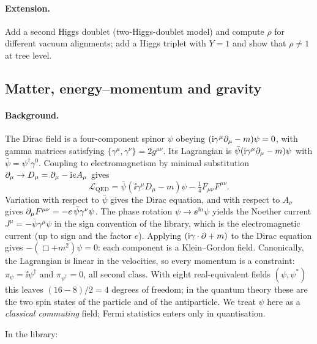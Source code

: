 \paragraph{Extension.} Add a second Higgs doublet (two-Higgs-doublet model) and compute $\rho$ for different vacuum alignments; add a Higgs triplet with $Y=1$ and show that $\rho\ne1$ at tree level.

\subsection{Matter, energy--momentum and gravity}


\paragraph{Background.} The Dirac field is a four-component spinor $\psi$ obeying $(\mathrm{i}\gamma^\mu\partial_\mu-m)\psi=0$, with gamma matrices satisfying $\{\gamma^\mu,\gamma^\nu\}=2g^{\mu\nu}$. Its Lagrangian is $\bar\psi(\mathrm{i}\gamma^\mu\partial_\mu-m)\psi$ with $\bar\psi=\psi^\dagger\gamma^0$. Coupling to electromagnetism by minimal substitution $\partial_\mu\to D_\mu=\partial_\mu-\mathrm{i} eA_\mu$ gives
\begin{equation}
\mathcal L_{\mathrm{QED}}=\bar\psi(\ii\gamma^\mu D_\mu-m)\psi-\tfrac14F_{\mu\nu}F^{\mu\nu}.
\end{equation}
Variation with respect to $\bar\psi$ gives the Dirac equation, and with respect to $A_\nu$ gives $\partial_\mu F^{\mu\nu}=-e\,\bar\psi\gamma^\nu\psi$. The phase rotation $\psi\to\ee^{\ii\alpha}\psi$ yields the Noether current $J^\mu=-\bar\psi\gamma^\mu\psi$ in the sign convention of the library, which is the electromagnetic current (up to sign and the factor $e$). Applying $(\mathrm{i}\gamma\cdot\partial+m)$ to the Dirac equation gives $-(\Box+m^2)\psi=0$: each component is a Klein--Gordon field. Canonically, the Lagrangian is linear in the velocities, so every momentum is a constraint: $\pi_\psi=\ii\psi^\dagger$ and $\pi_{\psi^\dagger}=0$, all second class. With eight real-equivalent fields $(\psi,\psi^*)$ this leaves $(16-8)/2=4$ degrees of freedom; in the quantum theory these are the two spin states of the particle and of the antiparticle. We treat $\psi$ here as a \emph{classical commuting} field; Fermi statistics enters only in quantisation.

In the library:


